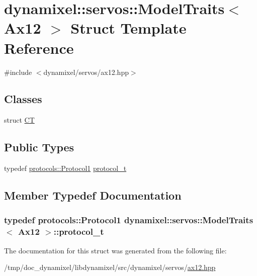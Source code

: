 \hypertarget{structdynamixel_1_1servos_1_1_model_traits_3_01_ax12_01_4}{}\section{dynamixel\+:\+:servos\+:\+:Model\+Traits$<$ Ax12 $>$ Struct Template Reference}
\label{structdynamixel_1_1servos_1_1_model_traits_3_01_ax12_01_4}


{\ttfamily \#include $<$dynamixel/servos/ax12.\+hpp$>$}

\subsection*{Classes}
\begin{DoxyCompactItemize}
\item 
struct \hyperlink{structdynamixel_1_1servos_1_1_model_traits_3_01_ax12_01_4_1_1_c_t}{CT}
\end{DoxyCompactItemize}
\subsection*{Public Types}
\begin{DoxyCompactItemize}
\item 
typedef \hyperlink{classdynamixel_1_1protocols_1_1_protocol1}{protocols\+::\+Protocol1} \hyperlink{structdynamixel_1_1servos_1_1_model_traits_3_01_ax12_01_4_a88d871f3f7b58c9bd9bb84da402237f8}{protocol\+\_\+t}
\end{DoxyCompactItemize}


\subsection{Member Typedef Documentation}
\subsubsection[{\texorpdfstring{protocol\+\_\+t}{protocol_t}}]{\setlength{\rightskip}{0pt plus 5cm}typedef {\bf protocols\+::\+Protocol1} {\bf dynamixel\+::servos\+::\+Model\+Traits}$<$ {\bf Ax12} $>$\+::{\bf protocol\+\_\+t}}\hypertarget{structdynamixel_1_1servos_1_1_model_traits_3_01_ax12_01_4_a88d871f3f7b58c9bd9bb84da402237f8}{}\label{structdynamixel_1_1servos_1_1_model_traits_3_01_ax12_01_4_a88d871f3f7b58c9bd9bb84da402237f8}


The documentation for this struct was generated from the following file\+:\begin{DoxyCompactItemize}
\item 
/tmp/doc\+\_\+dynamixel/libdynamixel/src/dynamixel/servos/\hyperlink{ax12_8hpp}{ax12.\+hpp}\end{DoxyCompactItemize}
